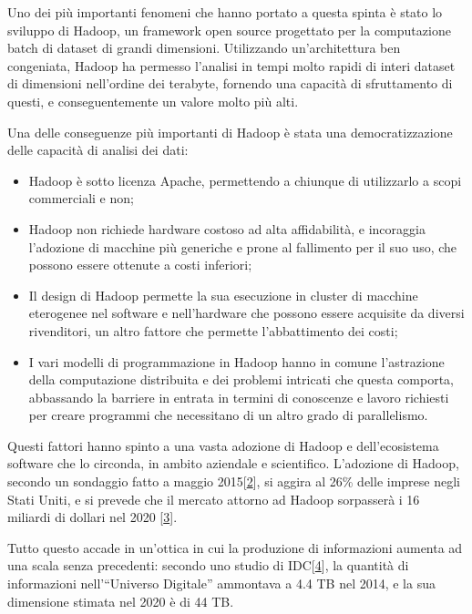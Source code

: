 \documentclass[italian,a4paper, twoside, 12pt]{report}
\providecommand{\tightlist}{%
  \setlength{\itemsep}{0pt}\setlength{\parskip}{0pt}}
\begin{document}
Uno dei più importanti fenomeni che hanno portato a questa spinta è
stato lo sviluppo di Hadoop, un framework open source progettato per la
computazione batch di dataset di grandi dimensioni. Utilizzando
un'architettura ben congeniata, Hadoop ha permesso l'analisi in tempi
molto rapidi di interi dataset di dimensioni nell'ordine dei terabyte,
fornendo una capacità di sfruttamento di questi, e conseguentemente un
valore molto più alti.

Una delle conseguenze più importanti di Hadoop è stata una
democratizzazione delle capacità di analisi dei dati:

\begin{itemize}
\tightlist
\item
  Hadoop è sotto licenza Apache, permettendo a chiunque di utilizzarlo a
  scopi commerciali e non;
\item
  Hadoop non richiede hardware costoso ad alta affidabilità, e
  incoraggia l'adozione di macchine più generiche e prone al fallimento
  per il suo uso, che possono essere ottenute a costi inferiori;
\item
  Il design di Hadoop permette la sua esecuzione in cluster di macchine
  eterogenee nel software e nell'hardware che possono essere acquisite
  da diversi rivenditori, un altro fattore che permette l'abbattimento
  dei costi;
\item
  I vari modelli di programmazione in Hadoop hanno in comune
  l'astrazione della computazione distribuita e dei problemi intricati
  che questa comporta, abbassando la barriere in entrata in termini di
  conoscenze e lavoro richiesti per creare programmi che necessitano di
  un altro grado di parallelismo.
\end{itemize}

Questi fattori hanno spinto a una vasta adozione di Hadoop e
dell'ecosistema software che lo circonda, in ambito aziendale e
scientifico. L'adozione di Hadoop, secondo un sondaggio fatto a maggio
2015{[}\protect\hyperlink{ref-hadoop-adoption-survey}{2}{]}, si aggira
al 26\% delle imprese negli Stati Uniti, e si prevede che il mercato
attorno ad Hadoop sorpasserà i 16 miliardi di dollari nel 2020
{[}\protect\hyperlink{ref-hadoop-market-analysis}{3}{]}.

Tutto questo accade in un'ottica in cui la produzione di informazioni
aumenta ad una scala senza precedenti: secondo uno studio di
IDC{[}\protect\hyperlink{ref-digital-univ}{4}{]}, la quantità di
informazioni nell'``Universo Digitale'' ammontava a 4.4 TB nel 2014, e
la sua dimensione stimata nel 2020 è di 44 TB.
\end{document}
